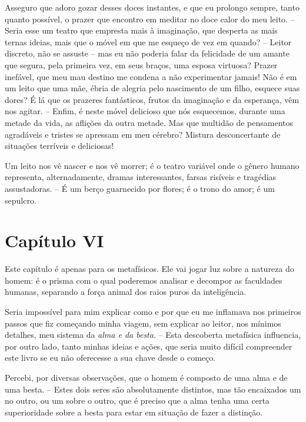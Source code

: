  Asseguro que adoro gozar desses doces instantes, e que eu prolongo
sempre, tanto quanto possível, o prazer que encontro em meditar no doce
calor do meu leito. -- Seria esse um teatro que empresta mais à
imaginação, que desperta as mais ternas ideias, mais que o móvel em que
me esqueço de vez em quando? -- Leitor discreto, não se assuste --
mas eu não poderia falar da felicidade de um amante que segura, pela
primeira vez, em seus braços, uma esposa virtuosa? Prazer inefável, que
meu mau destino me condena a não experimentar jamais! Não é em um leito
que uma mãe, ébria de alegria pelo nascimento de um filho, esquece suas
dores? É lá que os prazeres fantásticos, frutos da imaginação e da
esperança, vêm nos agitar. -- Enfim, é neste móvel delicioso que nós
esquecemos, durante uma metade da vida, as aflições da outra metade.
Mas que multidão de pensamentos agradáveis e tristes se apressam em meu
cérebro? Mistura desconcertante de situações terríveis e deliciosas!

 Um leito nos vê nascer e nos vê morrer; é o teatro variável onde o
gênero humano representa, alternadamente, dramas interessantes, farsas
risíveis e tragédias assustadoras. -- É um berço guarnecido por
flores; é o trono do amor; é um sepulcro.

\section{Capítulo VI}

 Este capítulo é apenas para os metafísicos. Ele vai jogar luz sobre a
natureza do homem: é o prisma com o qual poderemos analisar e decompor
as faculdades humanas, separando a força animal dos raios puros da
inteligência. 

 Seria impossível para mim explicar como e por que eu me inflamava nos
primeiros passos que fiz começando minha viagem, sem explicar ao
leitor, nos mínimos detalhes, meu sistema da \textit{alma e da besta}.
-- Esta descoberta metafísica influencia, por outro lado, tanto minhas
ideias e ações, que seria muito difícil compreender este livro se eu
não oferecesse a sua chave desde o começo.

 Percebi, por diversas observações, que o homem é composto de uma alma e
de uma besta. -- Estes dois seres são absolutamente distintos, mas tão
encaixados um no outro, ou um sobre o outro, que é preciso que a alma
tenha uma certa superioridade sobre a besta para estar em situação de
fazer a distinção.

